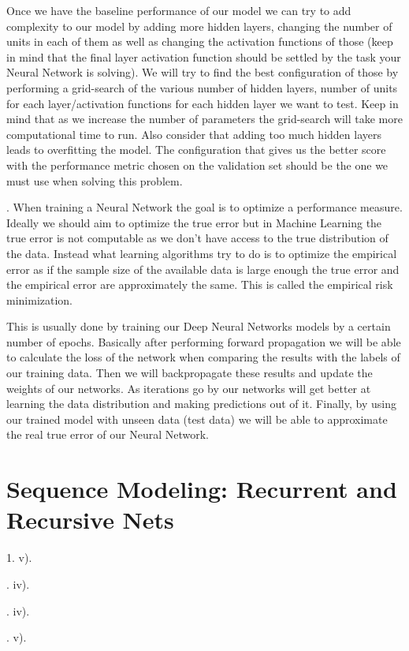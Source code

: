 \noindent Once we have the baseline performance of our model we can try to add complexity to our model by adding more hidden layers, changing the number of units in each of them as well as changing the activation functions of those (keep in mind that the final layer activation function should be settled by the task your Neural Network is solving). We will try to find the best configuration of those by performing a grid-search of the various number of hidden layers, number of units for each layer/activation functions for each hidden layer we want to test. Keep in mind that as we increase the number of parameters the grid-search will take more computational time to run. Also consider that adding too much hidden layers leads to overfitting the model. The configuration that gives us the better score with the performance metric chosen on the validation set should be the one we must use when solving this problem.

. When training a Neural Network the goal is to optimize a performance measure. Ideally we should aim to optimize the true error but in Machine Learning the true error is not computable as we don't have access to the true distribution of the data. Instead what learning algorithms try to do is to optimize the empirical error as if the sample size of the available data is large enough the true error and the empirical error are approximately the same. This is called the empirical risk minimization.

This is usually done by training our Deep Neural Networks models by a certain number of epochs. Basically after performing forward propagation we will be able to calculate the loss of the network when comparing the results with the labels of our training data. Then we will backpropagate these results and update the weights of our networks. As iterations go by our networks will get better at learning the data distribution and making predictions out of it. Finally, by using our trained model with unseen data (test data) we will be able to approximate the real true error of our Neural Network.

\section{Sequence Modeling: Recurrent and Recursive Nets}

1. v).

. iv).

. iv).

. v).


